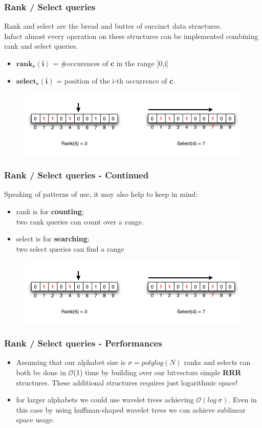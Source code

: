 \begin{frame}
\frametitle{Rank / Select queries}
Rank and select are the bread and butter of succinct data structures.
\\
Infact almost every operation on these structures can be implemented combining rank and select queries.
\medskip
\begin{itemize}
\item $\mathbf{rank_c(i)}$   = \#occurences of \textbf{c} in the range [0,i]
\item $\mathbf{select_c(i)}$ = position of the i-th occurrence of \textbf{c}. 
\end{itemize}
\begin{figure}
	\includegraphics[scale=0.33]{img/ranksel.png}
\end{figure}
\end{frame}


\begin{frame}
\frametitle{Rank / Select queries - Continued}
Speaking of patterns of use, it may also help to keep in mind:
\begin{itemize}
	\item rank is for \textbf{counting}; \\
	two rank queries can count over a range.
	\item select is for \textbf{searching}; \\
	two select queries can find a range
\end{itemize}
\begin{figure}
	\includegraphics[scale=0.33]{img/ranksel.png}
\end{figure}
\end{frame}


\begin{frame}
\frametitle{Rank / Select queries - Performances}
\begin{itemize}
	\item Assuming that our alphabet size is $ \sigma = polylog(N)$
	ranks and selects can both be done in $\mathcal{O}$(1) time
	by building over our bitvectors simple \textbf{RRR} structures. These additional structures requires just logarithmic space!
	\item for larger alphabets we could use wavelet trees achieving $\mathcal{O}(log \ \sigma)$. Even in this case by using huffman-shaped wavelet trees we can achieve sublinear space usage.
\end{itemize} 
\end{frame}
